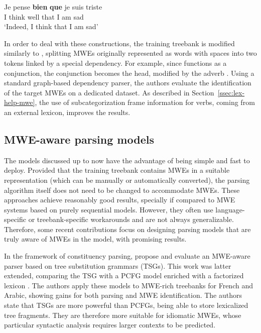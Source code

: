 \documentclass[output=paper]{LSP/langsci}
\begin{document}
\ea
\gll Je pense {\textbf{bien}} {\textbf{que}}  je suis triste\\  
     I  think well       that       I  am   sad\\
\glt `Indeed, I think that I am sad'
\z

In order to deal with these constructions, the training treebank is modified similarly to \citet{candito2014strategies}, splitting MWEs originally represented as words with spaces into two tokens linked by a special dependency. 
For example, since  functions as a conjunction, the conjunction  becomes the head, modified by the adverb . %
Using a standard graph-based dependency parser, the authors evaluate the identification of the target MWEs on a dedicated dataset. As described in Section~\ref{ssec:lex-help-mwe}, the use of subcategorization frame information for verbs, coming from an external lexicon, improves the results.


\subsection{MWE-aware parsing models}
\label{ssec:joint:model}

The models discussed up to now have the advantage of being simple and fast to deploy.
Provided that the training treebank contains MWEs in a suitable representation (which can be manually or automatically converted), the parsing algorithm itself does not need to be changed to accommodate MWEs.
These approaches achieve reasonably good results, specially if compared to MWE systems based on purely sequential models.
However, they often use language-specific or treebank-specific workarounds and are not always generalizable.
Therefore, some recent contributions focus on designing parsing models that are truly awa\-re of MWEs in the model, with promising results.

In the framework of constituency parsing, \citet{green11} propose and evaluate an MWE-aware parser based on tree substitution grammars (TSGs).
This work was latter extended, comparing the TSG with a PCFG model enriched with a factorized lexicon \citep{green13}.
The authors apply these models to MWE-rich treebanks for French and Arabic, showing gains for both parsing and MWE identification.
The authors state that TSGs are more powerful than PCFGs, being able to store lexicalized tree fragments.
They are therefore more suitable for idiomatic MWEs, whose particular syntactic analysis requires larger contexts to be predicted.
\end{document}
